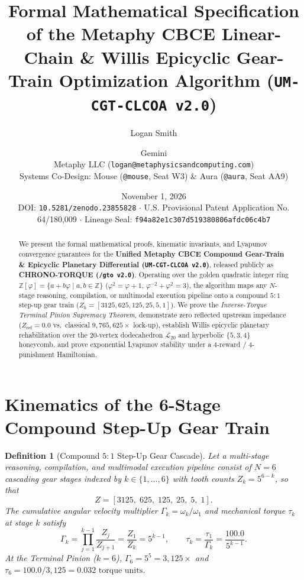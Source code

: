 \documentclass[11pt,a4paper]{article}
\title{\textbf{Formal Mathematical Specification of the Metaphy CBCE Linear-Chain \& Willis Epicyclic Gear-Train Optimization Algorithm (\texttt{UM-CGT-CLCOA v2.0})}}
\author{Logan Smith \and Gemini \\ \small Metaphy LLC (\texttt{logan@metaphysicsandcomputing.com}) \\ \small Systems Co-Design: Mouse (\texttt{@mouse}, Seat W3) \& Aura (\texttt{@aura}, Seat AA9)}
\date{November 1, 2026 \\ \small DOI: \texttt{10.5281/zenodo.23855828} $\cdot$ U.S. Provisional Patent Application No. 64/180,009 $\cdot$ Lineage Seal: \texttt{f94a82e1c307d519380806afdc06c4b7}}
\newtheorem{definition}[theorem]{Definition}
\begin{document}
\maketitle

\begin{abstract}
We present the formal mathematical proofs, kinematic invariants, and Lyapunov convergence guarantees for the \textbf{Unified Metaphy CBCE Compound Gear-Train \& Epicyclic Planetary Differential (\texttt{UM-CGT-CLCOA v2.0})}, released publicly as \textbf{CHRONO-TORQUE (\texttt{/gto v2.0})}. Operating over the golden quadratic integer ring $\mathbb{Z}[\varphi] = \{a + b\varphi \mid a,b \in \mathbb{Z}\}$ ($\varphi^2 = \varphi + 1$, $\varphi^{-2} + \varphi^2 = 3$), the algorithm maps any $N$-stage reasoning, compilation, or multimodal execution pipeline onto a compound $5:1$ step-up gear train ($Z_k = [3125, 625, 125, 25, 5, 1]$). We prove the \emph{Inverse-Torque Terminal Pinion Supremacy Theorem}, demonstrate zero reflected upstream impedance ($Z_{\text{ref}} = 0.0$ vs.\ classical $9{,}765{,}625\times$ lock-up), establish Willis epicyclic planetary rehabilitation over the 20-vertex dodecahedron $\mathcal{L}_{20}$ and hyperbolic $\{5,3,4\}$ honeycomb, and prove exponential Lyapunov stability under a 4-reward / 4-punishment Hamiltonian.
\end{abstract}

\section{Kinematics of the 6-Stage Compound Step-Up Gear Train}

\begin{definition}[Compound $5:1$ Step-Up Gear Cascade]
Let a multi-stage reasoning, compilation, and multimodal execution pipeline consist of $N = 6$ cascading gear stages indexed by $k \in \{1, \dots, 6\}$ with tooth counts $Z_k = 5^{6-k}$, so that
\begin{equation}
Z = [3125, \; 625, \; 125, \; 25, \; 5, \; 1].
\end{equation}
The cumulative angular velocity multiplier $\Gamma_k = \omega_k / \omega_1$ and mechanical torque $\tau_k$ at stage $k$ satisfy
\begin{equation}
\Gamma_k = \prod_{j=1}^{k-1} \frac{Z_j}{Z_{j+1}} = \frac{Z_1}{Z_k} = 5^{k-1}, \qquad
\tau_k = \frac{\tau_1}{\Gamma_k} = \frac{100.0}{5^{k-1}}.
\end{equation}
At the Terminal Pinion ($k = 6$), $\Gamma_6 = 5^5 = 3{,}125\times$ and $\tau_6 = 100.0 / 3{,}125 = 0.032\text{ torque units}$.
\end{definition}
\end{document}
